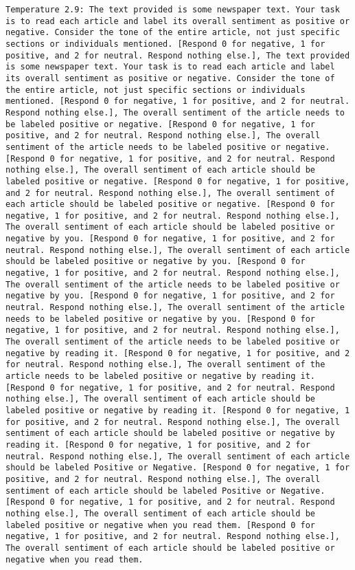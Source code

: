 \begin{lstlisting}[label=lst:poor_performing_prompts]
	Temperature 2.9: The text provided is some newspaper text. Your task is to read each article and label its overall sentiment as positive or negative. Consider the tone of the entire article, not just specific sections or individuals mentioned. [Respond 0 for negative, 1 for positive, and 2 for neutral. Respond nothing else.], The text provided is some newspaper text. Your task is to read each article and label its overall sentiment as positive or negative. Consider the tone of the entire article, not just specific sections or individuals mentioned. [Respond 0 for negative, 1 for positive, and 2 for neutral. Respond nothing else.], The overall sentiment of the article needs to be labeled positive or negative. [Respond 0 for negative, 1 for positive, and 2 for neutral. Respond nothing else.], The overall sentiment of the article needs to be labeled positive or negative. [Respond 0 for negative, 1 for positive, and 2 for neutral. Respond nothing else.], The overall sentiment of each article should be labeled positive or negative. [Respond 0 for negative, 1 for positive, and 2 for neutral. Respond nothing else.], The overall sentiment of each article should be labeled positive or negative. [Respond 0 for negative, 1 for positive, and 2 for neutral. Respond nothing else.], The overall sentiment of each article should be labeled positive or negative by you. [Respond 0 for negative, 1 for positive, and 2 for neutral. Respond nothing else.], The overall sentiment of each article should be labeled positive or negative by you. [Respond 0 for negative, 1 for positive, and 2 for neutral. Respond nothing else.], The overall sentiment of the article needs to be labeled positive or negative by you. [Respond 0 for negative, 1 for positive, and 2 for neutral. Respond nothing else.], The overall sentiment of the article needs to be labeled positive or negative by you. [Respond 0 for negative, 1 for positive, and 2 for neutral. Respond nothing else.], The overall sentiment of the article needs to be labeled positive or negative by reading it. [Respond 0 for negative, 1 for positive, and 2 for neutral. Respond nothing else.], The overall sentiment of the article needs to be labeled positive or negative by reading it. [Respond 0 for negative, 1 for positive, and 2 for neutral. Respond nothing else.], The overall sentiment of each article should be labeled positive or negative by reading it. [Respond 0 for negative, 1 for positive, and 2 for neutral. Respond nothing else.], The overall sentiment of each article should be labeled positive or negative by reading it. [Respond 0 for negative, 1 for positive, and 2 for neutral. Respond nothing else.], The overall sentiment of each article should be labeled Positive or Negative. [Respond 0 for negative, 1 for positive, and 2 for neutral. Respond nothing else.], The overall sentiment of each article should be labeled Positive or Negative. [Respond 0 for negative, 1 for positive, and 2 for neutral. Respond nothing else.], The overall sentiment of each article should be labeled positive or negative when you read them. [Respond 0 for negative, 1 for positive, and 2 for neutral. Respond nothing else.], The overall sentiment of each article should be labeled positive or negative when you read them. 
\end{lstlisting}
